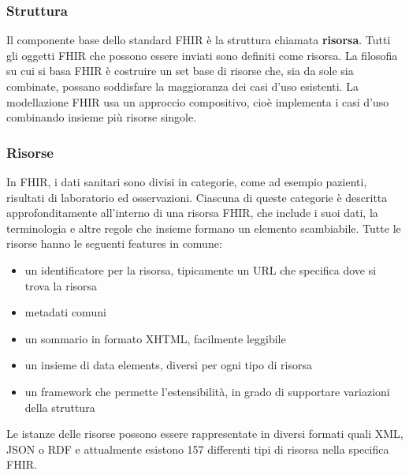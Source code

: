 \documentclass[a4paper]{article}
\begin{document}
\subsubsection{Struttura}
Il componente base dello standard FHIR è la struttura chiamata \textbf{risorsa}. Tutti gli oggetti FHIR che possono essere inviati sono definiti come risorsa.
La filosofia su cui si basa FHIR è costruire un set base di risorse che, sia da sole sia combinate, possano soddisfare la maggioranza dei casi d'uso esistenti.
La modellazione FHIR usa un approccio compositivo, cioè implementa i casi d'uso combinando insieme più risorse singole.

\subsubsection*{Risorse}
In FHIR, i dati sanitari sono divisi in categorie, come ad esempio pazienti, risultati di laboratorio ed osservazioni.
Ciascuna di queste categorie è descritta approfonditamente all'interno di una risorsa FHIR, che include i suoi dati, la terminologia e altre regole che insieme formano un elemento scambiabile.
Tutte le risorse hanno le seguenti features in comune:
\begin{itemize}
    \item un identificatore per la risorsa, tipicamente un URL che specifica dove si trova la risorsa
    \item metadati comuni
    \item un sommario in formato XHTML, facilmente leggibile
    \item un insieme di data elements, diversi per ogni tipo di risorsa
    \item un framework che permette l'estensibilità, in grado di supportare variazioni della struttura
\end{itemize}

Le istanze delle risorse possono essere rappresentate in diversi formati quali XML, JSON o RDF e attualmente esistono 157 differenti tipi di risorsa nella specifica FHIR.
\end{document}
